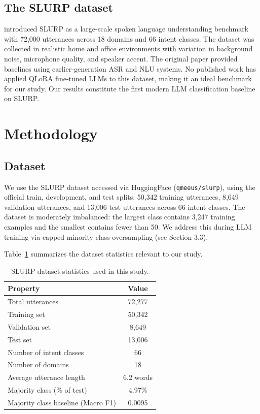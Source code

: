 \documentclass[11pt,a4paper]{article}
\begin{document}
\subsection{The SLURP dataset}

\citet{bastianelli2020slurp} introduced SLURP as a large-scale spoken language understanding benchmark with 72,000 utterances across 18 domains and 66 intent classes. The dataset was collected in realistic home and office environments with variation in background noise, microphone quality, and speaker accent. The original paper provided baselines using earlier-generation ASR and NLU systems. No published work has applied QLoRA fine-tuned LLMs to this dataset, making it an ideal benchmark for our study. Our results constitute the first modern LLM classification baseline on SLURP.

\section{Methodology}

\subsection{Dataset}

We use the SLURP dataset accessed via HuggingFace (\texttt{qmeeus/slurp}), using the official train, development, and test splits: 50,342 training utterances, 8,649 validation utterances, and 13,006 test utterances across 66 intent classes. The dataset is moderately imbalanced: the largest class contains 3,247 training examples and the smallest contains fewer than 50. We address this during LLM training via capped minority class oversampling (see Section 3.3).

Table~\ref{tab:dataset} summarizes the dataset statistics relevant to our study.

\begin{table}[H]
\centering
\caption{SLURP dataset statistics used in this study.}
\label{tab:dataset}
\begin{tabular}{lc}
\toprule
\textbf{Property} & \textbf{Value} \\
\midrule
Total utterances & 72,277 \\
Training set & 50,342 \\
Validation set & 8,649 \\
Test set & 13,006 \\
Number of intent classes & 66 \\
Number of domains & 18 \\
Average utterance length & 6.2 words \\
Majority class (\% of test) & 4.97\% \\
Majority class baseline (Macro F1) & 0.0095 \\
\bottomrule
\end{tabular}
\end{table}
\end{document}
